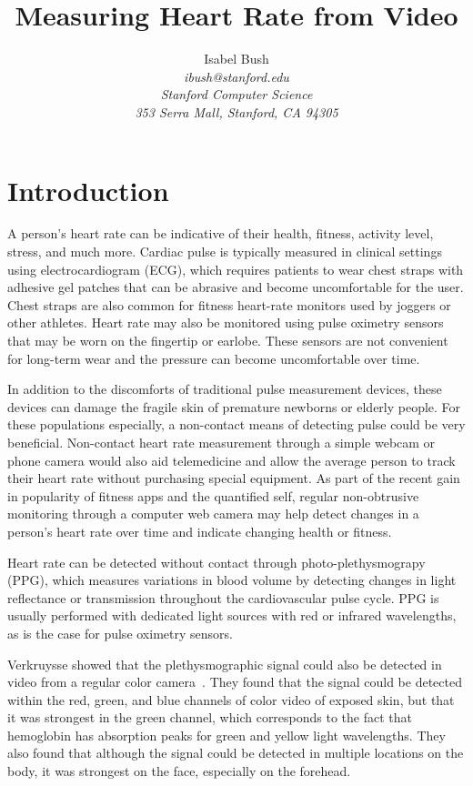 \documentclass[11pt,twocolumn,letterpaper]{article}
\begin{document}
\title{Measuring Heart Rate from Video}

\author{Isabel Bush\\
\it{ibush@stanford.edu}\\
Stanford Computer Science\\
353 Serra Mall, Stanford, CA 94305
}
\maketitle

\section*{Introduction}

A person's heart rate can be indicative of their health, fitness, activity level, stress, and much more. Cardiac pulse is typically measured in clinical settings using electrocardiogram (ECG), which requires patients to wear chest straps with adhesive gel patches that can be abrasive and become uncomfortable for the user. Chest straps are also common for fitness heart-rate monitors used by joggers or other athletes. Heart rate may also be monitored using pulse oximetry sensors that may be worn on the fingertip or earlobe. These sensors are not convenient for long-term wear and the pressure can become uncomfortable over time.

In addition to the discomforts of traditional pulse measurement devices, these devices can damage the fragile skin of premature newborns or elderly people. For these populations especially, a non-contact means of detecting pulse could be very beneficial. Non-contact heart rate measurement through a simple webcam or phone camera would also aid telemedicine and allow the average person to track their heart rate without purchasing special equipment. As part of the recent gain in popularity of fitness apps and the quantified self, regular non-obtrusive monitoring through a computer web camera may help detect changes in a person's heart rate over time and indicate changing health or fitness. 

Heart rate can be detected without contact through photo-plethysmograpy (PPG), which measures variations in blood volume by detecting changes in light reflectance or transmission throughout the cardiovascular pulse cycle. PPG is usually performed with dedicated light sources with red or infrared wavelengths, as is the case for pulse oximetry sensors. 

Verkruysse \etal showed that the plethysmographic signal could also be detected in video from a regular color camera~\cite{Nelson:2008aa}. They found that the signal could be detected within the red, green, and blue channels of color video of exposed skin, but that it was strongest in the green channel, which corresponds to the fact that hemoglobin has absorption peaks for green and yellow light wavelengths. They also found that although the signal could be detected in multiple locations on the body, it was strongest on the face, especially on the forehead.
\end{document}
